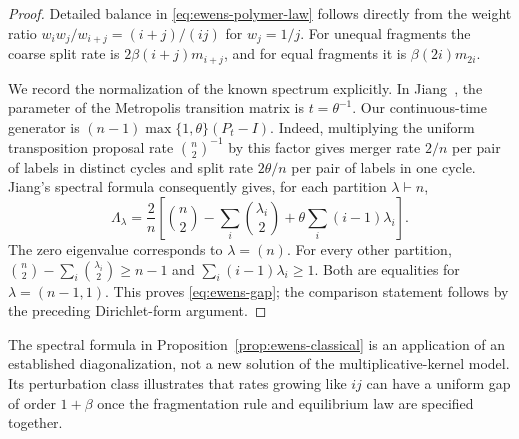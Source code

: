 \begin{proof}
Detailed balance in \eqref{eq:ewens-polymer-law} follows directly from
the weight ratio $w_iw_j/w_{i+j}=(i+j)/(ij)$ for $w_j=1/j$.
For unequal fragments the coarse split rate is
$2\beta(i+j)m_{i+j}$, and for equal fragments it is
$\beta(2i)m_{2i}$.

We record the normalization of the known spectrum explicitly.
In Jiang~\cite[Eq.~(7) and Theorem~4.2]{Jiang2015}, the parameter
of the Metropolis transition matrix is $t=\theta^{-1}$.
Our continuous-time generator is
$(n-1)\max\{1,\theta\}(P_t-I)$.
Indeed, multiplying the uniform transposition proposal rate
$\binom n2^{-1}$ by this factor gives merger rate $2/n$ per pair
of labels in distinct cycles and split rate $2\theta/n$ per pair
of labels in one cycle.
Jiang's spectral formula consequently gives, for each partition
$\lambda\vdash n$,
\[
 \Lambda_\lambda
 =\frac2n\left[
      \binom n2-\sum_i\binom{\lambda_i}{2}
       +\theta\sum_i(i-1)\lambda_i\right].
\]
The zero eigenvalue corresponds to $\lambda=(n)$.
For every other partition,
$\binom n2-\sum_i\binom{\lambda_i}{2}\ge n-1$ and
$\sum_i(i-1)\lambda_i\ge1$.
Both are equalities for $\lambda=(n-1,1)$.
This proves \eqref{eq:ewens-gap}; the comparison statement follows
by the preceding Dirichlet-form argument.
\end{proof}

The spectral formula in Proposition~\ref{prop:ewens-classical}
is an application of an established diagonalization, not a new
solution of the multiplicative-kernel model.
Its perturbation class illustrates that rates growing like $ij$
can have a uniform gap of order $1+\beta$ once the fragmentation
rule and equilibrium law are specified together.
